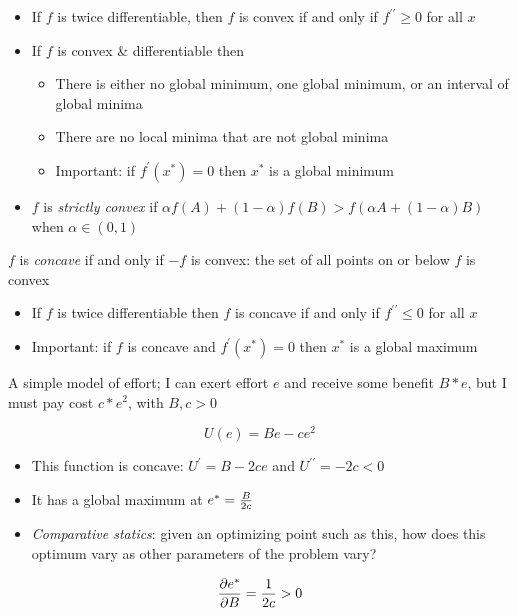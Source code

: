 \documentclass[10pt]{seminar}
\begin{document}
\begin{slide}
\begin{itemize}
\item If $f$ is twice differentiable, then $f$ is convex if and only if $f^{\prime\prime}\geq 0$ for all $x$

\item If $f$ is convex \& differentiable then
\begin{itemize}
\item There is either no global minimum, one global minimum, or an interval of global minima
\item There are no local minima that are not global minima
\item Important: if $f^\prime(x^*)=0$ then $x^*$ is a global minimum
\end{itemize}
\item $f$ is \textit{strictly convex} if $\alpha f(A)+(1-\alpha)f(B)> f(\alpha A+(1-\alpha)B)$ when $\alpha\in(0, 1)$
\end{itemize}

\newslide

$f$ is \textit{concave} if and only if $-f$ is convex: the set of all points on or below $f$ is convex

\begin{itemize}
\item If $f$ is twice differentiable then $f$ is concave if and only if $f^{\prime\prime}\leq 0$ for all $x$

\item Important: if $f$ is concave and $f^\prime(x^*)=0$ then $x^*$ is a global maximum

\end{itemize}

\newslide

A simple model of effort; I can exert effort $e$ and receive some benefit $B*e$, but I must pay cost $c*e^2$, with $B, c>0$

$$U(e)=Be-ce^2$$

\begin{itemize}
\item This function is concave: $U^\prime=B-2ce$ and $U^{\prime\prime}=-2c<0$

\item It has a global maximum at $e^*={{B}\over {2c}}$

\item \textit{Comparative statics}: given an optimizing point such as this, how does this optimum vary as other parameters of the problem vary?

\end{itemize}
 $${\partial e^* \over {\partial B}}={{1}\over{2c}}>0$$


\end{slide}
\end{document}
